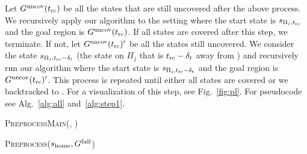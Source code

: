 \documentclass[conference]{IEEEtran}
\begin{document}
Let $G^{\textrm{uncov}}(t_{\textrm{rc}})$ be all the states that are still uncovered after the above process. We recursively apply our algorithm to the setting where the start state is $s_{\Pi_i, t_{\textrm{rc}}}$ and the goal region is $G^{\textrm{uncov}}(t_{\textrm{rc}})$.
If all states are covered after this step, we terminate. 
If not, let $G^{\textrm{uncov}}(t_{\textrm{rc}})'$ be all the states still uncovered.
We consider the state $s_{\Pi_i, t_{\textrm{rc}}-\delta_t}$ (the state on $\Pi_j$ that is $t_{\textrm{rc}}-\delta_t$ away from \Shome) and recursively run our algorithm where the start state is $s_{\Pi_i, t_{\textrm{rc}}-\delta_t}$ and the goal region is $G^{\textrm{uncov}}(t_{\textrm{rc}})'$.
This process is repeated until either all states are covered or we backtracked to \Shome.
For a visualization of this step, see Fig.~\ref{fig:pl}.
For pseudocode see Alg.~\ref{alg:all} and~\ref{alg:step1}.

\begin{algorithm}
\caption{\textsc{PreprocessMain(\Shome, \Gfull)}}\label{alg:all}
\begin{algorithmic}[1]
\State \textsc{Preprocess}($s_{\textrm{home}}, G^{\textrm{full}}$)
\end{algorithmic}
\end{algorithm}
\end{document}
